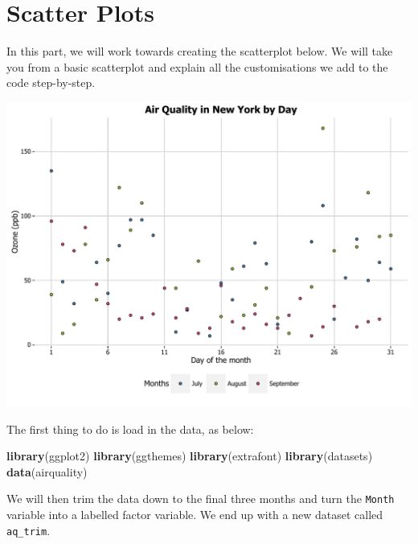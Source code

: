 \documentclass[]{article}
\newenvironment{Shaded}{\begin{snugshade}}{\end{snugshade}}
\newcommand{\KeywordTok}[1]{\textcolor[rgb]{0.13,0.29,0.53}{\textbf{{#1}}}}
\newcommand{\DataTypeTok}[1]{\textcolor[rgb]{0.13,0.29,0.53}{{#1}}}
\newcommand{\DecValTok}[1]{\textcolor[rgb]{0.00,0.00,0.81}{{#1}}}
\newcommand{\StringTok}[1]{\textcolor[rgb]{0.31,0.60,0.02}{{#1}}}
\newcommand{\NormalTok}[1]{{#1}}
\begin{document}
\section{Scatter Plots}\label{scatter-plots}

In this part, we will work towards creating the scatterplot below. We
will take you from a basic scatterplot and explain all the
customisations we add to the code step-by-step.

\begin{center}\includegraphics{0_all_posts_pdf/scatter_finalgraph-1} \end{center}

The first thing to do is load in the data, as below:

\begin{Shaded}
\begin{Highlighting}[]
\KeywordTok{library}\NormalTok{(ggplot2)}
\KeywordTok{library}\NormalTok{(ggthemes)}
\KeywordTok{library}\NormalTok{(extrafont)}
\KeywordTok{library}\NormalTok{(datasets)}
\KeywordTok{data}\NormalTok{(airquality)}
\end{Highlighting}
\end{Shaded}

We will then trim the data down to the final three months and turn the
\texttt{Month} variable into a labelled factor variable. We end up with
a new dataset called \texttt{aq\_trim}.

\begin{Shaded}
\end{Shaded}
\end{document}
